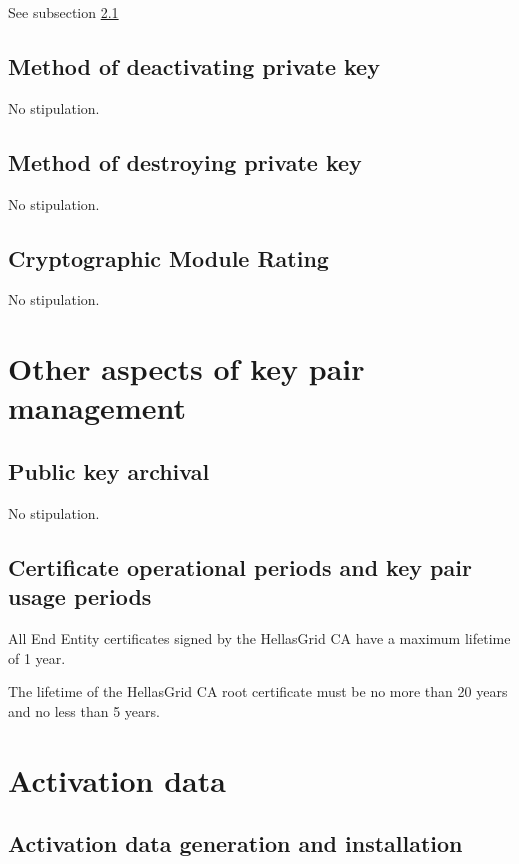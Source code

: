 See subsection \ref{sub:ActivationDataGenerationAndInstallation}

\subsection{Method of deactivating private key}

No stipulation.

\subsection{Method of destroying private key}

No stipulation.

\subsection{Cryptographic Module Rating}

No stipulation.

\section{Other aspects of key pair management}


\subsection{Public key archival}

No stipulation.

\subsection{Certificate operational periods and key pair usage periods}

All End Entity certificates signed by the HellasGrid CA have a maximum lifetime of 1 year.

The lifetime of the HellasGrid CA root certificate must be no more than 20 years and no less than 5 years.

\section{Activation data}
\subsection{Activation data generation and installation}
\label{sub:ActivationDataGenerationAndInstallation}

